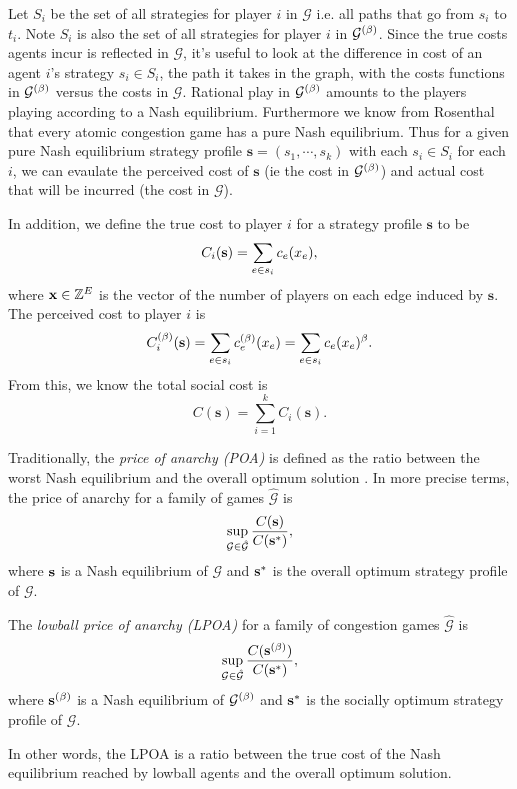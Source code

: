 \documentclass[twoside]{article}
\begin{document}
\begin{multicols}{2}
Let $S_i$ be the set of all strategies for player $i$ in $\mathcal{G}$ i.e. all
paths that go from $s_i$ to $t_i$.  Note $S_i$ is also the set of all strategies for
player $i$ in $\mathcal{G}^{(\beta)}$.  Since the true costs agents incur is
reflected in $\mathcal{G}$, it's useful to look at the difference in cost of an
agent $i$'s strategy $s_i \in S_i$, the path it takes in the graph, with the
costs functions in $\mathcal{G}^{(\beta)}$ versus the costs in $\mathcal{G}$.
Rational play in $\mathcal{G}^{(\beta)}$ amounts to the players playing according to
a Nash equilibrium.  Furthermore we know from Rosenthal \cite{Rosenthal1973}
that every atomic congestion game has a pure Nash equilibrium.  Thus for a given
pure Nash equilibrium strategy profile $\mathbf{s} = (s_1, \cdots, s_k)$ with
each $s_i \in S_i$ for each $i$, we can evaulate the perceived cost of
$\mathbf{s}$ (ie the cost in $\mathcal{G}^{(\beta)}$) and actual cost that will be
incurred (the cost in $\mathcal{G}$).

In addition, we define the true cost to player $i$ for a strategy profile
$\mathbf{s}$ to be
\[
  C_i(\mathbf{s}) = \sum\limits_{e \in s_i}c_e(x_e),
\]
where $\mathbf{x}
\in \mathbb{Z}^E$ is the vector of the number of players on each edge induced by
$\mathbf{s}$.  The perceived cost to player $i$ is
\[
  C^{(\beta)}_i(\mathbf{s}) = \sum\limits_{e \in s_i}c_e^{(\beta)}(x_e) = \sum\limits_{e \in
  s_i}c_e(x_e)^\beta.
\]
From this, we know the total social cost is
\[
  C(\mathbf{s}) = \sum_{i=1}^{k}C_i(\mathbf{s}).
\]
        
Traditionally, the \textit{price of anarchy (POA)} is defined as the ratio
between the worst Nash equilibrium and the overall optimum solution
\cite{Koutsoupias2009}.  In more precise terms, the price of anarchy for a
family of games $\hat{\mathcal{G}}$ is
\[
  \sup_{\mathcal{G} \in \hat{\mathcal{G}}} \frac{C(\mathbf{s})}{C(\mathbf{s}^*)},
\]
where $\mathbf{s}$ is a Nash equilibrium of $\mathcal{G}$ and $\mathbf{s}^*$ is the overall
optimum strategy profile of $\mathcal{G}$.

\begin{defn}
  The \textit{lowball price of anarchy (LPOA)} for a family of congestion games
  $\hat{\mathcal{G}}$ is
  \begin{equation}
    \sup_{\mathcal{G} \in \hat{\mathcal{G}}} \frac{C(\mathbf{s}^{(\beta)})}{C(\mathbf{s}^*)},
    \label{eq:lpoa}
  \end{equation}
  where $\mathbf{s}^{(\beta)}$ is a Nash equilibrium of $\mathcal{G}^{(\beta)}$ and $\mathbf{s}^*$ is the
  socially optimum strategy profile of $\mathcal{G}$.
\end{defn}
In other words, the LPOA is a ratio between the true cost of the Nash
equilibrium reached by lowball agents and the overall optimum solution.


\end{multicols}
\end{document}
